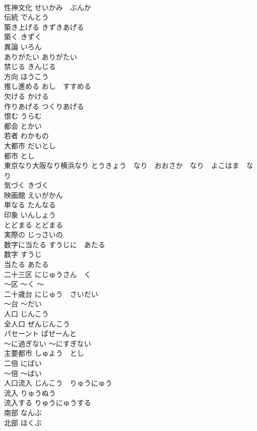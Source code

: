 \documentclass[8pt]{extreport}
\begin{document}
\begin{CJK}{UTF8}{min}
\\	性神文化	せいかみ　ぶんか	
\\	伝統	でんとう	
\\	築き上げる	きずきあげる	
\\	築く	きずく	
\\	異論	いろん	
\\	ありがたい	ありがたい	
\\	禁じる	きんじる	
\\	方向	ほうこう	
\\	推し進める	おし　すすめる	
\\	欠ける	かける	
\\	作りあげる	つくりあげる	
\\	恨む	うらむ	
\\	都会	とかい	
\\	若者	わかもの	
\\	大都市	だいとし	
\\	都市	とし	
\\	東京なり大阪なり横浜なり	とうきょう　なり　おおさか　なり　よこはま　なり	
\\	気づく	きづく	
\\	映画館	えいがかん	
\\	単なる	たんなる	
\\	印象	いんしょう	
\\	とどまる	とどまる	
\\	実際の	じっさいの	
\\	数字に当たる	すうじに　あたる	
\\	数字	すうじ	
\\	当たる	あたる	
\\	二十三区	にじゅうさん　く	
\\	〜区	〜く	〜
\\	二十歳台	にじゅう　さいだい	
\\	〜台	〜だい	
\\	人口	じんこう	
\\	全人口	ぜんじんこう	
\\	パセーント	ぱせーんと	
\\	〜に過ぎない	〜にすぎない	
\\	主要都市	しゅよう　とし	
\\	二倍	にばい	
\\	〜倍	〜ばい	
\\	人口流入	じんこう　りゅうにゅう	
\\	流入	りゅうぬう	
\\	流入する	りゅうにゅうする	
\\	南部	なんぶ	
\\	北部	ほくぶ	

\end{CJK}
\end{document}
